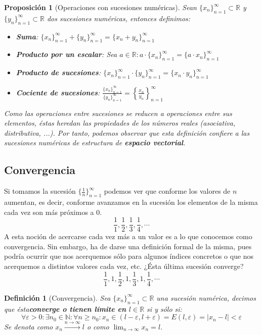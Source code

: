 \documentclass[10pt,a4paper,openright]{book}
\theoremstyle{break}
\newtheorem*{defi}{Definición}
\newtheorem*{prop}{Proposición}
\begin{document}
\begin{prop}[Operaciones con sucesiones numéricas]
Sean $\{x_n\}_{n=1}^{\infty}\subset \mathbb R$ y $\{y_n\}_{n=1}^{\infty}\subset \mathbb R$ dos sucesiones numéricas, entonces definimos:
\begin{itemize}
\item \textbf{Suma}: $\{x_n\}_{n=1}^{\infty}+\{y_n\}_{n=1}^{\infty}=\{x_n+y_n\}_{n=1}^{\infty}$

\item \textbf{Producto por un escalar}: Sea $a\in \mathbb R: a\cdot \{x_n\}_{n=1}^{\infty}=\{a\cdot x_n\}_{n=1}^{\infty}$

\item \textbf{Producto de sucesiones}: $\{x_n\}_{n=1}^{\infty}\cdot \{y_n\}_{n=1}^{\infty}=\{x_n\cdot y_n\}_{n=1}^{\infty}$

\item \textbf{Cociente de sucesiones}: $\frac{\{x_n\}_{n=1}^{\infty}}{\{y_n\}_{n=1}^{\infty}}=\left\lbrace\frac{x_n}{y_n}\right\rbrace_{n=1}^{\infty}$
\end{itemize}

Como las operaciones entre sucesiones se reducen a operaciones entre sus elementos, éstas heredan las propiedades de los números reales (asociativa, distributiva, ...). Por tanto, podemos observar que esta definición confiere a las sucesiones numéricas de estructura de \textbf{espacio vectorial}.
\end{prop}

\subsection{Convergencia}
Si tomamos la sucesión $\{\frac{1}{n}\}_{n=1}^{\infty}$ podemos ver que conforme los valores de $n$ aumentan, es decir, conforme avanzamos en la sucesión los elementos de la misma cada vez son más próximos a 0.
$$\frac{1}{1}, \frac{1}{2}, \frac{1}{3}, \frac{1}{4}, \cdots$$
A esta noción de acercarse cada vez más a un valor es a lo que conocemos como convergencia. Sin embargo, ha de darse una definición formal de la misma, pues podría ocurrir que nos acerquemos sólo para algunos índices concretos o que nos acerquemos a distintos valores cada vez, etc. ¿Ésta última sucesión converge?
$$\frac{1}{1}, 1, \frac{1}{2}, 1, \frac{1}{3}, 1, \frac{1}{4}, \cdots$$

\begin{defi}[Convergencia]
Sea $\{x_n\}_{n=1}^{\infty}\subset \mathbb R$ una sucesión numérica, decimos que ésta\textbf{converge o tienen límite en $l\in \mathbb R$} si y sólo si:
$$\forall \varepsilon>0: \exists n_0\in \mathbb N : \forall n\geq n_0: x_n\in (l-\varepsilon, l+\varepsilon)= E(l,\varepsilon)=|x_n-l|<\varepsilon$$
Se denota como $x_n \xrightarrow{n\rightarrow \infty}l$ o como $\lim_{n\rightarrow\infty}x_n = l$.
\end{defi}
\end{document}
